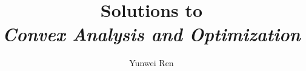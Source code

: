 

\title{Solutions to\\
\textit{Convex Analysis and Optimization}}
\author{Yunwei Ren}
\date{}


\maketitle
\tableofcontents
\newpage





